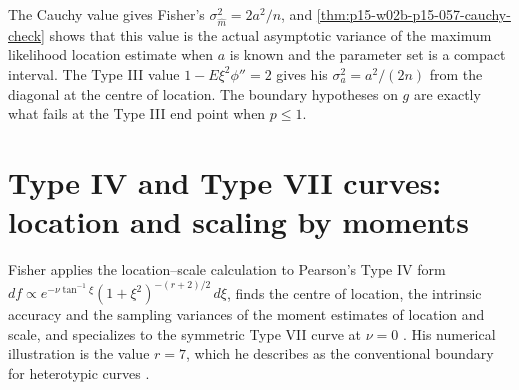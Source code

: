 The Cauchy value gives Fisher's \(\sigma_{\hat m}^2=2a^2/n\), and
\cref{thm:p15-w02b-p15-057-cauchy-check} shows that this value is the
actual asymptotic variance of the maximum likelihood location estimate
when \(a\) is known and the parameter set is a compact interval. The Type
III value \(1-E\xi^2\phi''=2\) gives his \(\sigma_a^2=a^2/(2n)\) from the
diagonal at the centre of location. The boundary hypotheses on \(g\) are
exactly what fails at the Type III end point when \(p\leq1\).

\section{Type IV and Type VII curves: location and scaling by moments}
\label{sec:p15-w02b-p15-057-type-iv}

Fisher applies the location--scale calculation to Pearson's Type IV form
\(df\propto e^{-\nu\tan^{-1}\xi}(1+\xi^2)^{-(r+2)/2}\,d\xi\), finds the
centre of location, the intrinsic accuracy and the sampling variances of
the moment estimates of location and scale, and specializes to the
symmetric Type VII curve at \(\nu=0\)
\cite[pp.~340--342]{Fisher1922Foundations}. His numerical illustration is
the value \(r=7\), which he describes as the conventional boundary for
heterotypic curves \cite[p.~341]{Fisher1922Foundations}.

